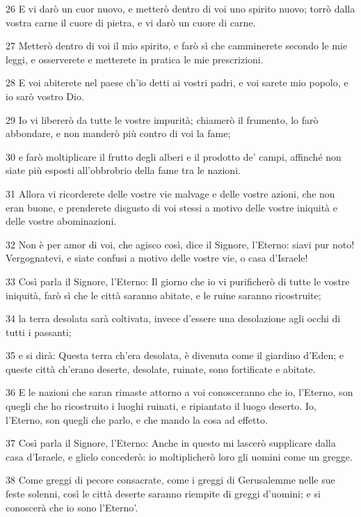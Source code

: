 \par 26 E vi darò un cuor nuovo, e metterò dentro di voi uno spirito nuovo; torrò dalla vostra carne il cuore di pietra, e vi darò un cuore di carne.
\par 27 Metterò dentro di voi il mio spirito, e farò sì che camminerete secondo le mie leggi, e osserverete e metterete in pratica le mie prescrizioni.
\par 28 E voi abiterete nel paese ch'io detti ai vostri padri, e voi sarete mio popolo, e io sarò vostro Dio.
\par 29 Io vi libererò da tutte le vostre impurità; chiamerò il frumento, lo farò abbondare, e non manderò più contro di voi la fame;
\par 30 e farò moltiplicare il frutto degli alberi e il prodotto de' campi, affinché non siate più esposti all'obbrobrio della fame tra le nazioni.
\par 31 Allora vi ricorderete delle vostre vie malvage e delle vostre azioni, che non eran buone, e prenderete disgusto di voi stessi a motivo delle vostre iniquità e delle vostre abominazioni.
\par 32 Non è per amor di voi, che agisco così, dice il Signore, l'Eterno: siavi pur noto! Vergognatevi, e siate confusi a motivo delle vostre vie, o casa d'Israele!
\par 33 Così parla il Signore, l'Eterno: Il giorno che io vi purificherò di tutte le vostre iniquità, farò sì che le città saranno abitate, e le ruine saranno ricostruite;
\par 34 la terra desolata sarà coltivata, invece d'essere una desolazione agli occhi di tutti i passanti;
\par 35 e si dirà: Questa terra ch'era desolata, è divenuta come il giardino d'Eden; e queste città ch'erano deserte, desolate, ruinate, sono fortificate e abitate.
\par 36 E le nazioni che saran rimaste attorno a voi conosceranno che io, l'Eterno, son quegli che ho ricostruito i luoghi ruinati, e ripiantato il luogo deserto. Io, l'Eterno, son quegli che parlo, e che mando la cosa ad effetto.
\par 37 Così parla il Signore, l'Eterno: Anche in questo mi lascerò supplicare dalla casa d'Israele, e glielo concederò: io moltiplicherò loro gli uomini come un gregge.
\par 38 Come greggi di pecore consacrate, come i greggi di Gerusalemme nelle sue feste solenni, così le città deserte saranno riempite di greggi d'uomini; e si conoscerà che io sono l'Eterno'.

